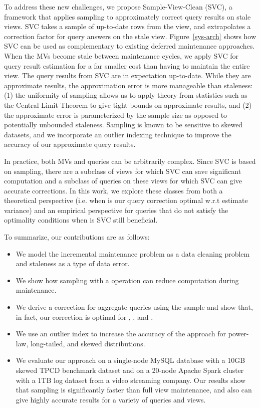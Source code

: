 To address these new challenges, we propose Sample-View-Clean (SVC), a framework that applies sampling to approximately correct query results on stale views.
SVC takes a sample of up-to-date rows from the view, and extrapolates a correction factor for query answers on the stale view. Figure~\ref{sys-arch} shows how SVC can be used as complementary to existing deferred maintenance approaches. When the MVs become stale between maintenance cycles, we apply SVC for query result estimation for a far smaller cost than having to maintain the entire view.
The query results from SVC are in expectation up-to-date. While they are approximate results, the approximation error is more manageable than staleness: (1) the uniformity of sampling allows us to apply theory from statistics such as the Central Limit Theorem to give tight bounds on approximate results, and (2) the approximate error is parameterized by the sample size as opposed to potentially unbounded staleness.
Sampling is known to be sensitive to skewed datasets, and we incorporate an outlier indexing technique to improve the accuracy of our approximate query results.

In practice, both MVs and queries can be arbitrarily complex.
Since SVC is based on sampling, there are a subclass of views for which SVC can save significant computation and a subclass of queries on these views for which SVC can give accurate corrections.
In this work, we explore these classes from both a theoretical perspective (i.e. when is our query correction optimal w.r.t estimate variance) and an empirical perspective for queries that do not satisfy the optimality conditions when is SVC still beneficial.

To summarize, our contributions are as follows:
\begin{itemize}\vspace{-.45em}
\item We model the incremental maintenance problem as a data cleaning problem and staleness as a type of data error.\vspace{-.45em}
\item We show how sampling with a \hashop operation can reduce computation during maintenance. \vspace{-.45em}
\item We derive a correction for aggregate queries using the sample and show that, in fact, our correction is optimal for \sumfunc, \countfunc, and \avgfunc. \vspace{-.45em}
\item We use an outlier index to increase the accuracy of the approach for power-law, long-tailed, and skewed distributions.\vspace{-.45em}
\item We evaluate our approach on a single-node MySQL database with a 10GB skewed TPCD benchmark dataset and on a 20-node Apache Spark cluster with a 1TB log dataset from a video streaming company. Our results show that sampling is significantly faster than full view maintenance, and also can give highly accurate results for a variety of queries and views.\vspace{-.45em}
\end{itemize}


